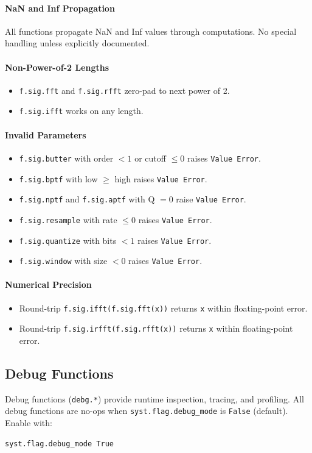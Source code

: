 \paragraph{NaN and Inf Propagation}
All functions propagate NaN and Inf values through computations. No special handling unless explicitly documented.

\paragraph{Non-Power-of-2 Lengths}
\begin{itemize}
\item \texttt{f.sig.fft} and \texttt{f.sig.rfft} zero-pad to next power of 2.
\item \texttt{f.sig.ifft} works on any length.
\end{itemize}

\paragraph{Invalid Parameters}
\begin{itemize}
\item \texttt{f.sig.butter} with order $< 1$ or cutoff $\leq 0$ raises \texttt{Value Error}.
\item \texttt{f.sig.bptf} with low $\geq$ high raises \texttt{Value Error}.
\item \texttt{f.sig.nptf} and \texttt{f.sig.aptf} with Q $= 0$ raise \texttt{Value Error}.
\item \texttt{f.sig.resample} with rate $\leq 0$ raises \texttt{Value Error}.
\item \texttt{f.sig.quantize} with bits $< 1$ raises \texttt{Value Error}.
\item \texttt{f.sig.window} with size $< 0$ raises \texttt{Value Error}.
\end{itemize}

\paragraph{Numerical Precision}
\begin{itemize}
\item Round-trip \texttt{f.sig.ifft(f.sig.fft(x))} returns \texttt{x} within floating-point error.
\item Round-trip \texttt{f.sig.irfft(f.sig.rfft(x))} returns \texttt{x} within floating-point error.
\end{itemize}

\subsection{Debug Functions}
\label{sec:debug-functions}
Debug functions (\texttt{debg.*}) provide runtime inspection, tracing, and profiling. All debug functions are no-ops when \texttt{syst.flag.debug\_mode} is \texttt{False} (default). Enable with:
\begin{verbatim}
syst.flag.debug_mode True
\end{verbatim}

